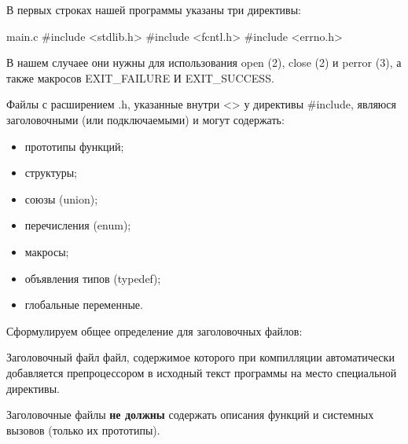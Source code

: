 В первых строках нашей программы указаны три директивы:

	\begin{CCode}{main.c}
			#include <stdlib.h>
			#include <fcntl.h>
			#include <errno.h> \end{CCode}

В нашем случаее они нужны для использования open (2), close (2) и perror (3), а также макросов EXIT\_FAILURE И EXIT\_SUCCESS.

Файлы с расширением .h, указанные внутри <{>} у директивы \#include, являюся заголовочными (или подключаемыми) и могут содержать:
	\begin{itemize}
		\item прототипы функций; 
		\item структуры;
		\item союзы (union);
		\item перечисления (enum);
		\item макросы;
		\item объявления типов (typedef);
		\item глобальные переменные.
	\end{itemize}

Сформулируем общее определение для заголовочных файлов:

\begin{defi}{Заголовочный файл}
	файл, содержимое которого при компилляции автоматически добавляется препроцессором в исходный текст программы на место специальной директивы.
\end{defi}

\begin{important}			
	Заголовочные файлы \textbf{не должны} содержать описания функций и системных вызовов (только их прототипы).
\end{important}
